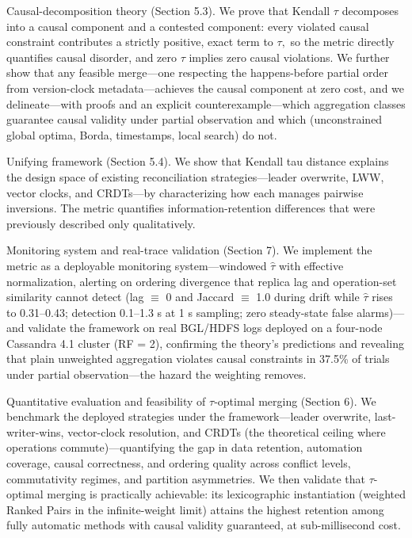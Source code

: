 \documentclass[11pt]{article}
\begin{document}
Causal-decomposition theory (Section 5.3). We prove that Kendall $\tau $ decomposes into a causal component and a contested component: every violated causal constraint contributes a strictly positive, exact term to $\tau ,$ so the metric directly quantifies causal disorder, and zero $\tau $ implies zero causal violations. We further show that any feasible merge—one respecting the happens-before partial order from version-clock metadata—achieves the causal component at zero cost, and we delineate—with proofs and an explicit counterexample—which aggregation classes guarantee causal validity under partial observation and which (unconstrained global optima, Borda, timestamps, local search) do not.

Unifying framework (Section 5.4). We show that Kendall tau distance explains the design space of existing reconciliation strategies—leader overwrite, LWW, vector clocks, and CRDTs—by characterizing how each manages pairwise inversions. The metric quantifies information-retention differences that were previously described only qualitatively.

Monitoring system and real-trace validation (Section 7). We implement the metric as a deployable monitoring system—windowed $\hat{\tau}$ with effective normalization, alerting on ordering divergence that replica lag and operation-set similarity cannot detect (lag $\equiv $ 0 and Jaccard $\equiv $ 1.0 during drift while $\hat{\tau}$ rises to 0.31–0.43; detection 0.1–1.3 s at 1 s sampling; zero steady-state false alarms)—and validate the framework on real BGL/HDFS logs deployed on a four-node Cassandra 4.1 cluster (RF = 2), confirming the theory's predictions and revealing that plain unweighted aggregation violates causal constraints in 37.5\% of trials under partial observation—the hazard the weighting removes.

Quantitative evaluation and feasibility of $\tau $-optimal merging (Section 6). We benchmark the deployed strategies under the framework—leader overwrite, last-writer-wins, vector-clock resolution, and CRDTs (the theoretical ceiling where operations commute)—quantifying the gap in data retention, automation coverage, causal correctness, and ordering quality across conflict levels, commutativity regimes, and partition asymmetries. We then validate that $\tau $-optimal merging is practically achievable: its lexicographic instantiation (weighted Ranked Pairs in the infinite-weight limit) attains the highest retention among fully automatic methods with causal validity guaranteed, at sub-millisecond cost.
\end{document}
